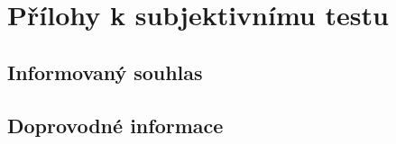 \chapter{Přílohy k subjektivnímu testu}
\label{app:2}
\section{Informovaný souhlas}

\begin{figure}[H]
    \centering
    \label{pdf:agreement}
\end{figure}

\section{Doprovodné informace}

\begin{figure}[H]
    \centering
    \label{pdf:info}
\end{figure}
